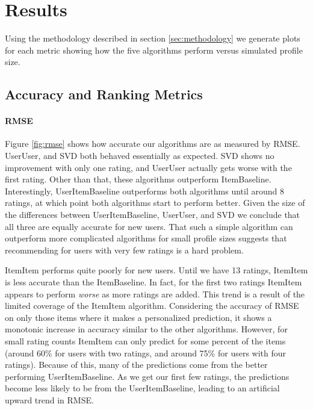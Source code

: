 \documentclass[letterpaper]{sig-alternate}
\begin{document}
\section{Results}

  Using the methodology described in section \ref{sec:methodology} we generate plots for each metric showing how the five algorithms perform versus simulated profile size.


  
\subsection*{Accuracy and Ranking Metrics}

\vspace{-1.5em}
 
  \paragraph{RMSE}
  Figure \ref{fig:rmse} shows how accurate our algorithms are as measured by RMSE.
  UserUser, and SVD both behaved essentially as expected.
  SVD shows no improvement with only one rating, and UserUser actually gets worse with the first rating.
  Other than that, these algorithms outperform ItemBaseline.
  Interestingly, UserItemBaseline outperforms both algorithms until around 8 ratings, at which point both algorithms start to perform better.
  Given the size of the differences between UserItemBaseline, UserUser, and SVD we conclude that all three are equally accurate for new users.
  That such a simple algorithm can outperform more complicated algorithms for small profile sizes suggests that recommending for users with very few ratings is a hard problem.
  
  ItemItem performs quite poorly for new users.
  Until we have 13 ratings, ItemItem is less accurate than the ItemBaseline.
  In fact, for the first two ratings ItemItem appears to perform \emph{worse} as more ratings are added.
  This trend is a result of the limited coverage of the ItemItem algorithm.
  Considering the accuracy of RMSE on only those items where it makes a personalized prediction, it shows a monotonic increase in accuracy similar to the other algorithms.
  However, for small rating counts ItemItem can only predict for some percent of the items (around 60\% for users with two ratings, and around 75\% for users with four ratings).
  Because of this, many of the predictions come from the better performing UserItemBaseline.
  As we get our first few ratings, the predictions become less likely to be from the UserItemBaseline, leading to an artificial upward trend in RMSE.
  
\end{document}
